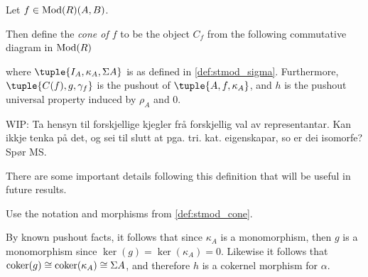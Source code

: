 \begin{definition}
    \label{def:stmod_cone}
    Let \( f \in \operatorname{Mod}(R)(A, B) \).
    
    Then define the \emph{cone of \( f \)} to be the object \( C_f \) from the following commutative diagram in \( \operatorname{Mod}(R) \)
    \begin{center}
    \end{center}
    where \( \tuple{I_A, \kappa_A, \Sigma A} \) is as defined in \autoref{def:stmod_sigma}. Furthermore, \( \tuple{C(f), g, \gamma_f} \) is the pushout of \( \tuple{A, f, \kappa_A} \), and \( h \) is the pushout universal property induced by \( \rho_A \) and \( 0 \).
\end{definition}

WIP: Ta hensyn til forskjellige kjegler frå forskjellig val av representantar. Kan ikkje tenka på det, og sei til slutt at pga. tri. kat. eigenskapar, so er dei isomorfe? Spør MS.


There are some important details following this definition that will be useful in future results.

\begin{remark}
    \label{rem:stmod_cone_pushout_properties}
    Use the notation and morphisms from \autoref{def:stmod_cone}.

    By known pushout facts, it follows that since \( \kappa_A \) is a monomorphism, then \( g \) is a monomorphism since \( \ker(g) = \ker(\kappa_A) = 0 \). Likewise it follows that \( \operatorname{coker}(g) \cong \operatorname{coker}(\kappa_A) \cong \Sigma A \), and therefore \( h \) is a cokernel morphism for \( \alpha \).
\end{remark}

